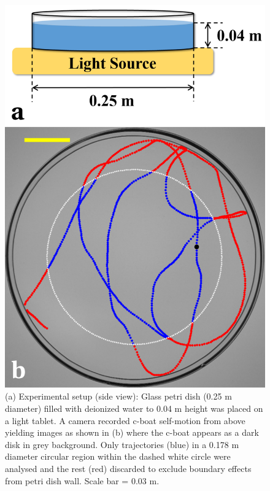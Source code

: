 \documentclass[journal=langd5, manuscript=article, layout=twocolumn]{achemso}
\begin{document}
\begin{figure}[ht]
\centering
\includegraphics[width=0.9\linewidth]{figure1_v2.pdf}
\caption{(a) Experimental setup (side view): Glass petri dish (0.25 m diameter) filled with deionized water to 0.04 m height was placed on a light tablet. A camera recorded c-boat self-motion from above yielding images as shown in (b) where the c-boat appears as a dark disk in grey background. Only trajectories (blue) in a 0.178 m diameter circular region within the dashed white circle were analysed and the rest (red) discarded to exclude boundary effects from petri dish wall. Scale bar = 0.03 m.}
\label{fig1}
\end{figure}
\end{document}
